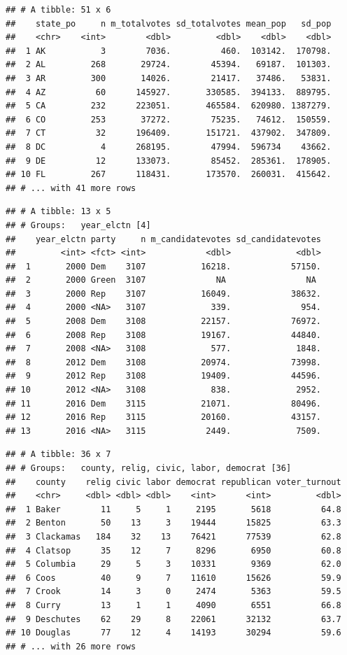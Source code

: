 \documentclass[
  english,
  man]{apa6}
\begin{document}
\begin{verbatim}
## # A tibble: 51 x 6
##    state_po     n m_totalvotes sd_totalvotes mean_pop   sd_pop
##    <chr>    <int>        <dbl>         <dbl>    <dbl>    <dbl>
##  1 AK           3        7036.          460.  103142.  170798.
##  2 AL         268       29724.        45394.   69187.  101303.
##  3 AR         300       14026.        21417.   37486.   53831.
##  4 AZ          60      145927.       330585.  394133.  889795.
##  5 CA         232      223051.       465584.  620980. 1387279.
##  6 CO         253       37272.        75235.   74612.  150559.
##  7 CT          32      196409.       151721.  437902.  347809.
##  8 DC           4      268195.        47994.  596734    43662.
##  9 DE          12      133073.        85452.  285361.  178905.
## 10 FL         267      118431.       173570.  260031.  415642.
## # ... with 41 more rows
\end{verbatim}

\begin{verbatim}
## # A tibble: 13 x 5
## # Groups:   year_elctn [4]
##    year_elctn party     n m_candidatevotes sd_candidatevotes
##         <int> <fct> <int>            <dbl>             <dbl>
##  1       2000 Dem    3107           16218.            57150.
##  2       2000 Green  3107              NA                NA 
##  3       2000 Rep    3107           16049.            38632.
##  4       2000 <NA>   3107             339.              954.
##  5       2008 Dem    3108           22157.            76972.
##  6       2008 Rep    3108           19167.            44840.
##  7       2008 <NA>   3108             577.             1848.
##  8       2012 Dem    3108           20974.            73998.
##  9       2012 Rep    3108           19409.            44596.
## 10       2012 <NA>   3108             838.             2952.
## 11       2016 Dem    3115           21071.            80496.
## 12       2016 Rep    3115           20160.            43157.
## 13       2016 <NA>   3115            2449.             7509.
\end{verbatim}

\begin{verbatim}
## # A tibble: 36 x 7
## # Groups:   county, relig, civic, labor, democrat [36]
##    county    relig civic labor democrat republican voter_turnout
##    <chr>     <dbl> <dbl> <dbl>    <int>      <int>         <dbl>
##  1 Baker        11     5     1     2195       5618          64.8
##  2 Benton       50    13     3    19444      15825          63.3
##  3 Clackamas   184    32    13    76421      77539          62.8
##  4 Clatsop      35    12     7     8296       6950          60.8
##  5 Columbia     29     5     3    10331       9369          62.0
##  6 Coos         40     9     7    11610      15626          59.9
##  7 Crook        14     3     0     2474       5363          59.5
##  8 Curry        13     1     1     4090       6551          66.8
##  9 Deschutes    62    29     8    22061      32132          63.7
## 10 Douglas      77    12     4    14193      30294          59.6
## # ... with 26 more rows
\end{verbatim}
\end{document}
